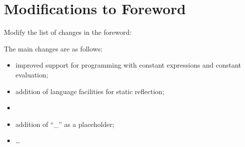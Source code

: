 \section{Modifications to Foreword}

Modify the list of changes in the foreword:

\begin{modification}
The main changes are as follows:

\begin{itemize}[label=\textemdash]

\item
improved support for programming with constant expressions and constant evaluation;

\item
addition of language facilities for static reflection;

\item
{}

\item
addition of “\_” as a placeholder;

\item
\ldots

\end{itemize}

\end{modification}
